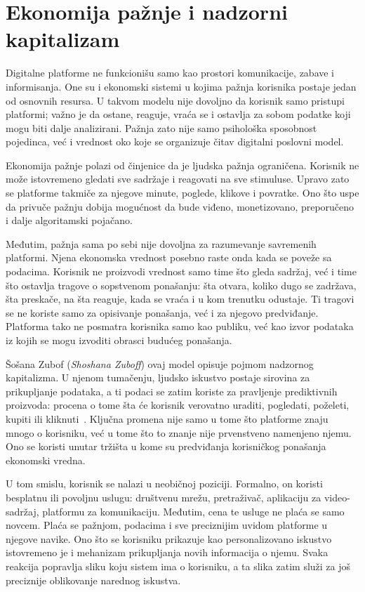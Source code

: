 \section{Ekonomija pažnje i nadzorni kapitalizam}

Digitalne platforme ne funkcionišu samo kao prostori komunikacije, zabave i informisanja. One su i ekonomski sistemi u kojima pažnja korisnika postaje jedan od osnovnih resursa. U takvom modelu nije dovoljno da korisnik samo pristupi platformi; važno je da ostane, reaguje, vraća se i ostavlja za sobom podatke koji mogu biti dalje analizirani. Pažnja zato nije samo psihološka sposobnost pojedinca, već i vrednost oko koje se organizuje čitav digitalni poslovni model.

Ekonomija pažnje polazi od činjenice da je ljudska pažnja ograničena. Korisnik ne može istovremeno gledati sve sadržaje i reagovati na sve stimuluse. Upravo zato se platforme takmiče za njegove minute, poglede, klikove i povratke. Ono što uspe da privuče pažnju dobija mogućnost da bude viđeno, monetizovano, preporučeno i dalje algoritamski pojačano.

Međutim, pažnja sama po sebi nije dovoljna za razumevanje savremenih platformi. Njena ekonomska vrednost posebno raste onda kada se poveže sa podacima. Korisnik ne proizvodi vrednost samo time što gleda sadržaj, već i time što ostavlja tragove o sopstvenom ponašanju: šta otvara, koliko dugo se zadržava, šta preskače, na šta reaguje, kada se vraća i u kom trenutku odustaje. Ti tragovi se ne koriste samo za opisivanje ponašanja, već i za njegovo predviđanje. Platforma tako ne posmatra korisnika samo kao publiku, već kao izvor podataka iz kojih se mogu izvoditi obrasci budućeg ponašanja.

Šošana Zubof (\textit{Shoshana Zuboff}) ovaj model opisuje pojmom nadzornog kapitalizma. U njenom tumačenju, ljudsko iskustvo postaje sirovina za prikupljanje podataka, a ti podaci se zatim koriste za pravljenje prediktivnih proizvoda: procena o tome šta će korisnik verovatno uraditi, pogledati, poželeti, kupiti ili kliknuti~\cite{zuboff2015bigother}. Ključna promena nije samo u tome što platforme znaju mnogo o korisniku, već u tome što to znanje nije prvenstveno namenjeno njemu. Ono se koristi unutar tržišta u kome su predviđanja korisničkog ponašanja ekonomski vredna.

U tom smislu, korisnik se nalazi u neobičnoj poziciji. Formalno, on koristi besplatnu ili povoljnu uslugu: društvenu mrežu, pretraživač, aplikaciju za video-sadržaj, platformu za komunikaciju. Međutim, cena te usluge ne plaća se samo novcem. Plaća se pažnjom, podacima i sve preciznijim uvidom platforme u njegove navike. Ono što se korisniku prikazuje kao personalizovano iskustvo istovremeno je i mehanizam prikupljanja novih informacija o njemu. Svaka reakcija popravlja sliku koju sistem ima o korisniku, a ta slika zatim služi za još preciznije oblikovanje narednog iskustva.

